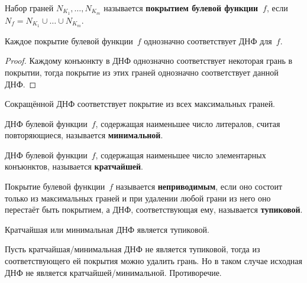  Набор граней $N_{K_1}, \ldots, N_{K_m}$ называется \textbf{покрытием булевой функции~$f$}, если $N_f = N_{K_1} \cup \ldots \cup N_{K_m}$.

\begin{statement}
Каждое покрытие булевой функции~$f$ однозначно соответствует ДНФ для~$f$.
\end{statement}
\begin{proof}
Каждому конъюнкту в ДНФ однозначно соответствует некоторая грань в покрытии, тогда покрытие из этих граней однозначно соответствует данной ДНФ.
\end{proof}

\begin{consequent}
Сокращённой ДНФ соответствует покрытие из всех максимальных граней.
\end{consequent}

ДНФ булевой функции~$f$, содержащая наименьшее число литералов, считая повторяющиеся, называется \textbf{минимальной}.

ДНФ булевой функции~$f$, содержащая наименьшее число элементарных конъюнктов, называется \textbf{кратчайшей}.

Покрытие булевой функции~$f$ называется \textbf{неприводимым}, если оно состоит только из максимальных граней и при удалении любой грани из него оно перестаёт быть покрытием, а ДНФ, соответствующая ему, называется \textbf{тупиковой}.

\begin{statement}
Кратчайшая или минимальная ДНФ является тупиковой.
\end{statement}
\begin{proofcontra}
Пусть кратчайшая/минимальная ДНФ не является тупиковой, тогда из соответствующего ей покрытия можно удалить грань.
Но в таком случае исходная ДНФ не является кратчайшей/минимальной.
Противоречие.
\end{proofcontra}